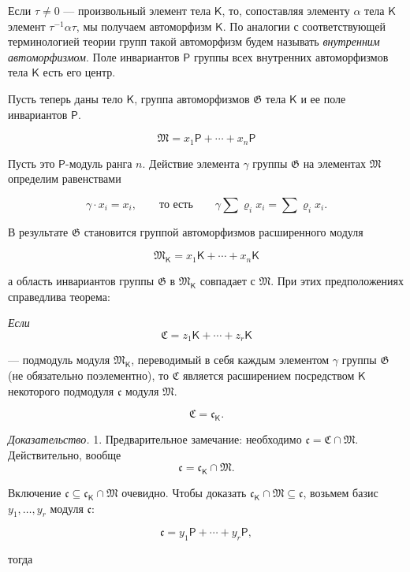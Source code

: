 \documentclass[11pt]{article}
\begin{document}
Если \(\tau\ne 0\) --- произвольный элемент тела \(\mathsf K\), то, сопоставляя элементу \(\alpha\) тела \(\mathsf K\) элемент \(\tau^{-1}\alpha\tau\), мы получаем автоморфизм \(\mathsf K\). По аналогии с соответствующей терминологией теории групп такой автоморфизм будем называть \emph{внутренним автоморфизмом}. Поле инвариантов \(\mathsf P\) группы всех внутренних автоморфизмов тела \(\mathsf K\) есть его центр.

Пусть теперь даны тело \(\mathsf K\), группа автоморфизмов \(\mathfrak G\) тела \(\mathsf K\) и ее поле инвариантов \(\mathsf P\).

\[
\mathfrak M=x_1\mathsf P+\cdots+x_n\mathsf P
\]

Пусть это \(\mathsf P\)-модуль ранга \(n\). Действие элемента \(\gamma\) группы \(\mathfrak G\) на элементах \(\mathfrak M\) определим равенствами

\[
\gamma\cdot x_i=x_i,\qquad\text{то есть}\qquad
\gamma\sum \varrho_i x_i=\sum \varrho_i x_i.
\]

В результате \(\mathfrak G\) становится группой автоморфизмов расширенного модуля

\[
\mathfrak M_{\mathsf K}=x_1\mathsf K+\cdots+x_n\mathsf K
\]

а область инвариантов группы \(\mathfrak G\) в \(\mathfrak M_{\mathsf K}\) совпадает с \(\mathfrak M\). При этих предположениях справедлива теорема:

\begingroup\itshape
Если
\[
\mathfrak C=z_1\mathsf K+\cdots+z_r\mathsf K
\]

--- подмодуль модуля \(\mathfrak M_{\mathsf K}\), переводимый в себя каждым элементом \(\gamma\) группы \(\mathfrak G\) (не обязательно поэлементно), то \(\mathfrak C\) является расширением посредством \(\mathsf K\) некоторого подмодуля \(\mathfrak c\) модуля \(\mathfrak M\).

\[
\mathfrak C=\mathfrak c_{\mathsf K}.
\]
\endgroup

\emph{Доказательство.} 1. Предварительное замечание: необходимо \(\mathfrak c=\mathfrak C\cap\mathfrak M\). Действительно, вообще
\[
\mathfrak c=\mathfrak c_{\mathsf K}\cap\mathfrak M.
\]

Включение \(\mathfrak c\subseteq\mathfrak c_{\mathsf K}\cap\mathfrak M\) очевидно. Чтобы доказать \(\mathfrak c_{\mathsf K}\cap\mathfrak M\subseteq\mathfrak c\), возьмем базис \(y_1,\ldots,y_r\) модуля \(\mathfrak c\):

\[
\mathfrak c=y_1\mathsf P+\cdots+y_r\mathsf P,
\]

тогда
\end{document}

